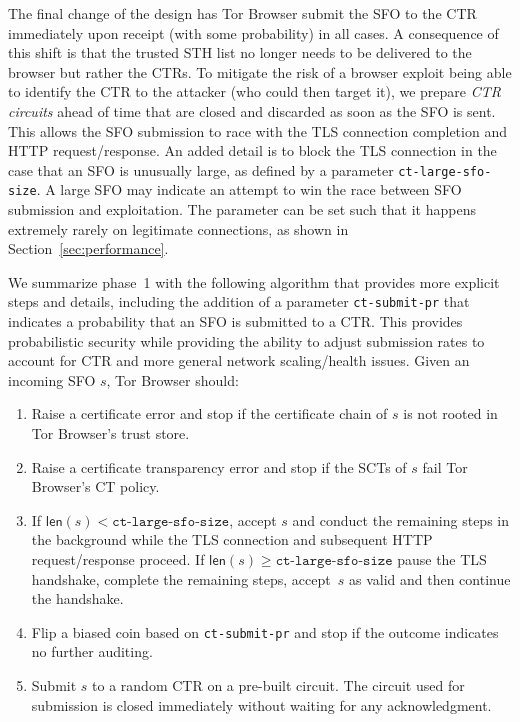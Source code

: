 The final change of the design has Tor Browser submit the SFO to the CTR
immediately upon receipt (with some probability) in all cases. A consequence of
this shift is that the trusted STH list no longer needs to be delivered to the
browser but rather the CTRs. To mitigate the risk of a browser exploit being
able to identify the CTR to the attacker (who could then target it), we prepare
\emph{CTR circuits} ahead of time that are closed and discarded as soon as the
SFO is sent. This allows the SFO submission to race with the TLS connection
completion and HTTP request/response. An added detail is to block the TLS
connection in the case that an SFO is unusually large, as defined by a parameter
\texttt{ct-large-sfo-size}. A large SFO may indicate an attempt to win the race
between SFO submission and exploitation. The parameter can be set such that it
happens extremely rarely on legitimate connections, as shown in
Section~\ref{sec:performance}.

We summarize phase~1 with the following algorithm that provides more explicit
steps and details, including the addition of a parameter \texttt{ct-submit-pr}
that indicates a probability that an SFO is submitted to a CTR. This provides
probabilistic security while providing the ability to adjust submission rates to
account for
CTR and more general network scaling/health issues. Given an incoming SFO $s$,
Tor Browser should:
\begin{enumerate}
    \item Raise a certificate error and stop if the certificate chain of $s$
        is not rooted in Tor Browser's trust store.
    \item Raise a certificate transparency error and stop if the SCTs of $s$
        fail Tor Browser's CT policy.
    \item If $\mathsf{len}(s) < \texttt{ct-large-sfo-size}$, accept $s$ and
        conduct the remaining steps in the background while the TLS connection
        and subsequent HTTP request/response proceed. If $\mathsf{len}(s) \geq
        \texttt{ct-large-sfo-size}$ pause the TLS handshake, complete the
        remaining steps, accept~$s$ as valid and then continue the handshake.
    \item Flip a biased coin based on \texttt{ct-submit-pr} and stop if the
        outcome indicates no further auditing.
    \item Submit $s$ to a random CTR on a pre-built circuit. The circuit used
        for submission is closed immediately without waiting for any
        acknowledgment.
\end{enumerate}

